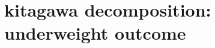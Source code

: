 \documentclass{article}
\begin{document}




\newpage
\section{kitagawa decomposition: underweight outcome}


\begin{table}[H]
    \centering
    \footnotesize %
    \caption{: Dalit fwd decomposition}
    \label{tab:sumstat}
\end{table}

\begin{table}[H]
    \centering
    \footnotesize %
    \caption{: Adivasi fwd decomposition}
    \label{tab:sumstat}
\end{table}



\begin{table}[H]
    \centering
    \footnotesize %
    \caption{: Muslim fwd decomposition}
    \label{tab:sumstat}
\end{table}
\end{document}
